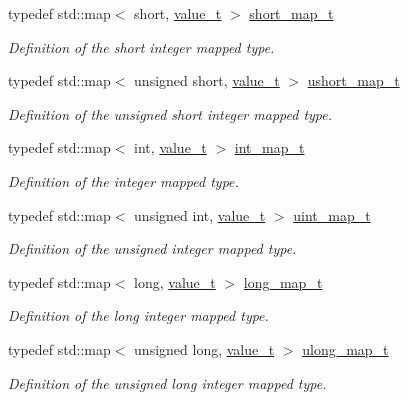 \begin{DoxyCompactItemize}
typedef std::map$<$ short, \hyperlink{class_t}{value\_\-t} $>$ \hyperlink{struct_d_d4hep_1_1_primitive_ad899cb08d4a2d808891f5297600653ae}{short\_\-map\_\-t}
\begin{DoxyCompactList}\small\item\em Definition of the short integer mapped type. \item\end{DoxyCompactList}\item 
typedef std::map$<$ unsigned short, \hyperlink{class_t}{value\_\-t} $>$ \hyperlink{struct_d_d4hep_1_1_primitive_a05bca6a7dcdad2a935793e45d9746079}{ushort\_\-map\_\-t}
\begin{DoxyCompactList}\small\item\em Definition of the unsigned short integer mapped type. \item\end{DoxyCompactList}\item 
typedef std::map$<$ int, \hyperlink{class_t}{value\_\-t} $>$ \hyperlink{struct_d_d4hep_1_1_primitive_acfd7524785eae3d3470f44b23ce0424f}{int\_\-map\_\-t}
\begin{DoxyCompactList}\small\item\em Definition of the integer mapped type. \item\end{DoxyCompactList}\item 
typedef std::map$<$ unsigned int, \hyperlink{class_t}{value\_\-t} $>$ \hyperlink{struct_d_d4hep_1_1_primitive_a6c4a254056e6d4de6c023c0f099ad40f}{uint\_\-map\_\-t}
\begin{DoxyCompactList}\small\item\em Definition of the unsigned integer mapped type. \item\end{DoxyCompactList}\item 
typedef std::map$<$ long, \hyperlink{class_t}{value\_\-t} $>$ \hyperlink{struct_d_d4hep_1_1_primitive_ad93415660e6d4d711daa9d9135c6e2b5}{long\_\-map\_\-t}
\begin{DoxyCompactList}\small\item\em Definition of the long integer mapped type. \item\end{DoxyCompactList}\item 
typedef std::map$<$ unsigned long, \hyperlink{class_t}{value\_\-t} $>$ \hyperlink{struct_d_d4hep_1_1_primitive_ab4ba00823c6afd9907a1d53af783d2fe}{ulong\_\-map\_\-t}
\begin{DoxyCompactList}\small\item\em Definition of the unsigned long integer mapped type. \item\end{DoxyCompactList}\item 

\end{DoxyCompactItemize}
